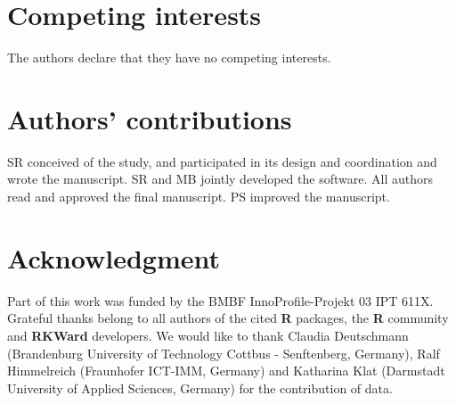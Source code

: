 \documentclass[twocolumn]{bmcart}%
\begin{document}

\begin{backmatter}

\section*{Competing interests}
The authors declare that they have no competing interests.

\section*{Authors' contributions}
SR conceived of the study, and participated in its design and coordination and 
wrote the manuscript. SR and MB jointly developed the software. All authors read 
and approved the final manuscript. PS improved the manuscript.

\section*{Acknowledgment}
Part of this work was funded by the BMBF InnoProfile-Projekt 03 IPT 611X. 
Grateful thanks belong to all authors of the cited \textbf{R} packages, the 
\textbf{R} community and \textbf{RKWard} developers. We would like to thank 
Claudia Deutschmann (Brandenburg University of Technology Cottbus - Senftenberg, 
Germany), Ralf Himmelreich (Fraunhofer ICT-IMM, Germany) and Katharina Klat 
(Darmstadt University of Applied Sciences, Germany) for the contribution of 
data.


\end{backmatter}
\end{document}
